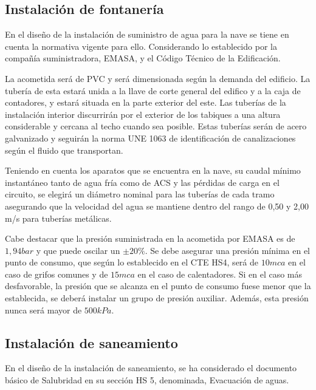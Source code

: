 \documentclass[../main.tex]{subfiles}
\begin{document}
\subsection{Instalación de fontanería}
En el diseño de la instalación de suministro de agua para la nave se tiene en cuenta la normativa vigente para ello. Considerando lo establecido por la compañía suministradora, EMASA, y el Código Técnico de la Edificación. \par
\vspace{0.5 cm}
La acometida será de PVC y será dimensionada según la demanda del edificio. La tubería de esta estará unida a la llave de corte general del edifico y a la caja de contadores, y estará situada en la parte exterior del este. Las tuberías de la instalación interior discurrirán por el exterior de los tabiques a una altura considerable y cercana al techo cuando sea posible. Estas tuberías serán de acero galvanizado y seguirán la norma UNE 1063 de identificación de canalizaciones según el fluido que transportan. \par
\vspace{0.5 cm}
Teniendo en cuenta los aparatos que se encuentra en la nave, su caudal mínimo instantáneo tanto de agua fría como de ACS y las pérdidas de carga en el circuito, se elegirá un diámetro nominal para las tuberías de cada tramo asegurando que la velocidad del agua se mantiene dentro del rango de 0,50 y 2,00 m/s para tuberías metálicas. \par
\vspace{0.5 cm}
Cabe destacar que la presión suministrada en la acometida por EMASA es de $1,94 bar$ y que puede oscilar un $\pm 20 \%$. Se debe asegurar una presión mínima en el punto de consumo, que según lo establecido en el CTE HS4, será de $10 mca$ en el caso de grifos comunes y de $15 mca$ en el caso de calentadores. Si en el caso más desfavorable, la presión que se alcanza en el punto de consumo fuese menor que la establecida, se deberá instalar un grupo de presión auxiliar. Además, esta presión nunca será mayor de $500 kPa$. \par

\subsection{Instalación de saneamiento}

En el diseño de la instalación de saneamiento, se ha considerado el documento básico de Salubridad en su sección HS 5, denominada, Evacuación de aguas. 
\end{document}
